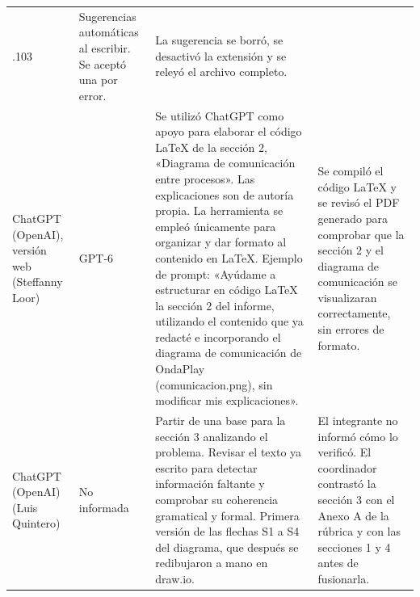 \begin{table}[H]
\begin{tabularx}{\textwidth}{@{}>{\raggedright\arraybackslash}p{2.5cm}>{\raggedright\arraybackslash}p{1.7cm}>{\raggedright\arraybackslash}X>{\raggedright\arraybackslash}X@{}}
    1.0.103 &
    Sugerencias automáticas al escribir. Se aceptó una por error. &
    La sugerencia se borró, se desactivó la extensión y se releyó el
    archivo completo. \\
    \addlinespace
    ChatGPT (OpenAI), versión web (Steffanny Loor) &
    GPT-6 &
    Se utilizó ChatGPT como apoyo para elaborar el código LaTeX
    de la sección 2, «Diagrama de comunicación entre procesos».
    Las explicaciones son de autoría propia. La herramienta se
    empleó únicamente para organizar y dar formato al contenido
    en LaTeX. Ejemplo de prompt: «Ayúdame a estructurar en código
    LaTeX la sección 2 del informe, utilizando el contenido que
    ya redacté e incorporando el diagrama de comunicación de
    OndaPlay (comunicacion.png), sin modificar mis explicaciones». &
    Se compiló el código LaTeX y se revisó el PDF generado para
    comprobar que la sección 2 y el diagrama de comunicación se
    visualizaran correctamente, sin errores de formato. \\
    \addlinespace
    ChatGPT (OpenAI) (Luis Quintero) &
    No informada &
    Partir de una base para la sección 3 analizando el problema. Revisar
    el texto ya escrito para detectar información faltante y comprobar su
    coherencia gramatical y formal. Primera versión de las flechas S1 a S4
    del diagrama, que después se redibujaron a mano en draw.io. &
    El integrante no informó cómo lo verificó. El coordinador contrastó la
    sección 3 con el Anexo A de la rúbrica y con las secciones 1 y 4 antes
    de fusionarla. \\
    \bottomrule
  \end{tabularx}
\end{table}